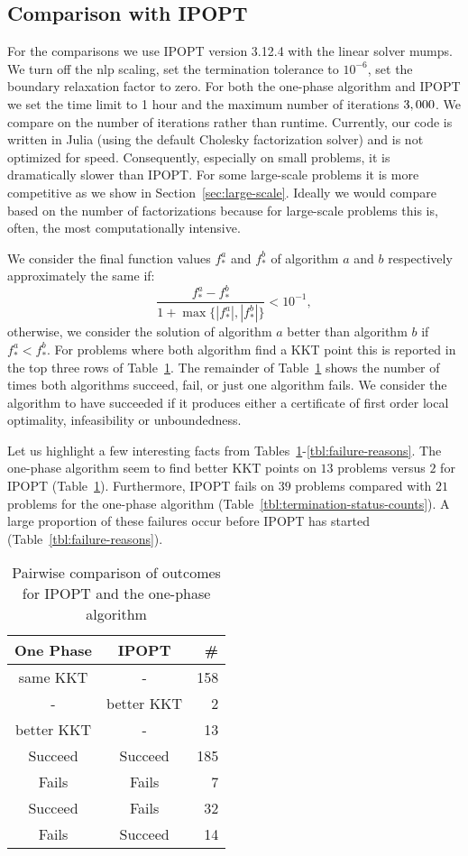 \documentclass{article}
\begin{document}
\subsection{Comparison with IPOPT}\label{alg:comparison-IPOPT}
For the comparisons we use IPOPT version 3.12.4 with the linear solver mumps. We turn off the nlp scaling, set the termination tolerance to $10^{-6}$, set the boundary relaxation factor to zero. For both the one-phase algorithm and IPOPT we set the time limit to 1 hour and the maximum number of iterations $3,000$. We compare on the number of iterations rather than runtime. Currently, our code is written in Julia (using the default Cholesky factorization solver) and is not optimized for speed. Consequently, especially on small problems, it is dramatically slower than IPOPT. For some large-scale problems it is more competitive as we show in Section~\ref{sec:large-scale}. Ideally we would compare based on the number of factorizations because for large-scale problems this is, often, the most computationally intensive.


We consider the final function values $f^{a}_{*}$ and $f^{b}_{*}$ of algorithm $a$ and $b$ respectively approximately the same if:
$$
\frac{f^{a}_{*} - f^{b}_{*}}{1 + \max \{ | f^{a}_{*} |, | f^{b}_{*} | \} } < 10^{-1},
$$
otherwise, we consider the solution of algorithm $a$ better than algorithm $b$ if $f^{a}_{*}  < f^{b}_{*}$. For problems where both algorithm find a KKT point this is reported in the top three rows of Table~\ref{tbl:pairwise-outcomes}. The remainder of Table~\ref{tbl:pairwise-outcomes} shows the number of times both algorithms succeed, fail, or just one algorithm fails. We consider the algorithm to have succeeded if it produces either a certificate of first order local optimality, infeasibility or unboundedness. 

Let us highlight a few interesting facts from Tables~\ref{tbl:pairwise-outcomes}-\ref{tbl:failure-reasons}. The one-phase algorithm seem to find better KKT points on $13$ problems versus $2$ for IPOPT (Table~\ref{tbl:pairwise-outcomes}). Furthermore, IPOPT fails on $39$ problems compared with $21$ problems for the one-phase algorithm (Table~\ref{tbl:termination-status-counts}). A large proportion of these failures occur before IPOPT has started (Table~\ref{tbl:failure-reasons}).

\begin{table}[H]
\caption{Pairwise comparison of outcomes for IPOPT and the one-phase algorithm}\label{tbl:pairwise-outcomes}
\begin{tabular}{ c c r }
  One Phase &  IPOPT &  \# \\
  \hline
same KKT & - & 158  \\
- & better KKT & 2 \\
better KKT & - &  13 \\
\hline
Succeed & Succeed & 185 \\
Fails & Fails & 7 \\
Succeed & Fails &  32 \\
Fails & Succeed & 14 \\
\end{tabular}
\end{table}
\end{document}

